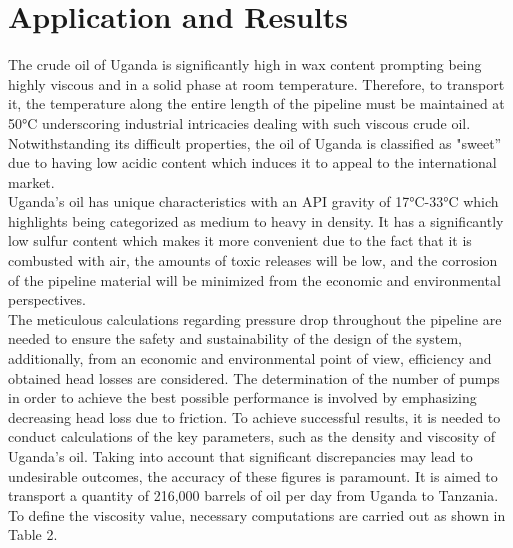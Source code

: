 \documentclass[12pt]{article}
\begin{document}
\section{Application and Results}
{\fontsize{12}{12}\selectfont 
The crude oil of Uganda is significantly high in wax content prompting being highly viscous and in a solid phase at room temperature. Therefore, to transport it, the temperature along the entire length of the pipeline must be maintained at 50°C underscoring industrial intricacies dealing with such viscous crude oil. Notwithstanding its difficult properties, the oil of Uganda is classified as "sweet” due to having low acidic content which induces it to appeal to the international market. 
\\

Uganda's oil has unique characteristics with an API gravity of 17°C-33°C which highlights being categorized as medium to heavy in density. It has a significantly low sulfur content which makes it more convenient due to the fact that it is combusted with air, the amounts of toxic releases will be low, and the corrosion of the pipeline material will be minimized from the economic and environmental perspectives.
\\

The meticulous calculations regarding pressure drop throughout the pipeline are needed to ensure the safety and sustainability of the design of the system, additionally, from an economic and environmental point of view, efficiency and obtained head losses are considered. The determination of the number of pumps in order to achieve the best possible performance is involved by emphasizing decreasing head loss due to friction. To achieve successful results, it is needed to conduct calculations of the key parameters, such as the density and viscosity of Uganda's oil. Taking into account that significant discrepancies may lead to undesirable outcomes, the accuracy of these figures is paramount. It is aimed to transport a quantity of 216,000 barrels of oil per day from Uganda to Tanzania.
\\

To define the viscosity value, necessary computations are carried out as shown in Table 2.

}
\end{document}
